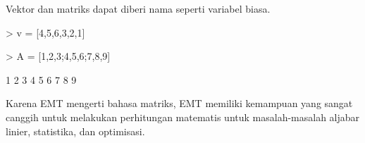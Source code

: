 \documentclass{report}
\begin{document}
\begin{eulernotebook}
\begin{eulercomment}
\begin{eulercomment}
\begin{eulercomment}
Vektor dan matriks dapat diberi nama seperti variabel biasa.
\end{eulercomment}
\begin{eulerprompt}
> v = [4,5,6,3,2,1]
\end{eulerprompt}
\begin{euleroutput}
  [4,  5,  6,  3,  2,  1]
\end{euleroutput}
\begin{eulerprompt}
> A = [1,2,3;4,5,6;7,8,9]
\end{eulerprompt}
\begin{euleroutput}
              1             2             3 
              4             5             6 
              7             8             9 
\end{euleroutput}
\begin{eulercomment}
Karena EMT mengerti bahasa matriks, EMT memiliki kemampuan yang sangat
canggih untuk melakukan perhitungan matematis untuk masalah-masalah
aljabar linier, statistika, dan optimisasi.


\end{eulercomment}
\end{eulercomment}
\end{eulercomment}
\end{eulernotebook}
\end{document}
